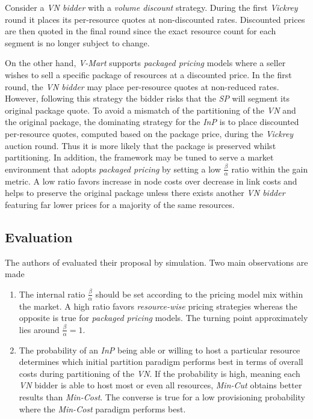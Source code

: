 \documentclass[prodmode,acmtomccap]{acmlarge}
\begin{document}
Consider a \emph{VN bidder} with a \emph{volume discount} strategy. During the first \emph{Vickrey} round it places its per-resource quotes at non-discounted rates.
Discounted prices are then quoted in the final round since the exact resource count for each segment is no longer subject to change.

On the other hand, \emph{V-Mart} supports \emph{packaged pricing} models where a seller wishes to sell a specific package of resources at a discounted price.
In the first round, the \emph{VN bidder} may place per-resource quotes at non-reduced rates. However, following this strategy the bidder risks that the \emph{SP}
will segment its original package quote. To avoid a mismatch of the partitioning of the \emph{VN} and the original package, the dominating strategy for the \emph{InP}
is to place discounted per-resource quotes, computed based on the package price, during the \emph{Vickrey} auction round. Thus it is more likely that the package is preserved
whilst partitioning. In addition, the framework may be tuned to serve a market environment that adopts \emph{packaged pricing} by
setting a low $\frac{\beta}{\alpha}$ ratio within the gain metric. A low ratio favors increase in node costs over decrease in link costs and helps to preserve the original package unless there
exists another \emph{VN bidder} featuring far lower prices for a majority of the same resources.

\subsection{Evaluation}
The authors of  evaluated their proposal by simulation. Two main observations are made

\begin{enumerate}
	\item The internal ratio $\frac{\beta}{\alpha}$ should be set according to the pricing model mix within the market. A high ratio favors \emph{resource-wise}
		pricing strategies whereas the opposite is true for \emph{packaged pricing} models. The turning point approximately lies around $\frac{\beta}{\alpha} = 1$.
	\item The probability of an \emph{InP} being able or willing to host a particular resource determines which initial partition paradigm performs best in terms of overall costs 
		during partitioning of the \emph{VN}. If the probability is high, meaning each \emph{VN} bidder is able to host most or even all resources, \emph{Min-Cut} obtains
		better results than \emph{Min-Cost}. The converse is true for a low provisioning probability where the \emph{Min-Cost} paradigm performs best.
\end{enumerate}
\end{document}
